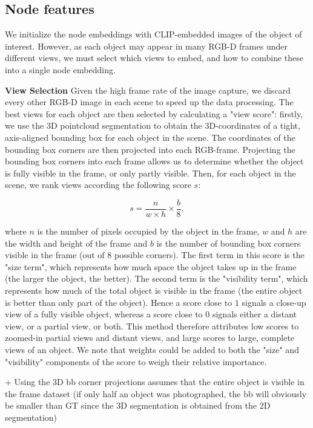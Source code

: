 \subsection{Node features}
We initialize the node embeddings with CLIP-embedded images of the object of interest. However, as each object may appear in many RGB-D frames under different views, we must select which views to embed, and how to combine these into a single node embedding.

\bigskip
\noindent
\textbf{View Selection}
Given the high frame rate of the image capture, we discard every other RGB-D image in each scene to speed up the data processing. The best views for each object are then selected by calculating a "view score": firstly, we use the 3D pointcloud segmentation to obtain the 3D-coordinates of a tight, axis-aligned bounding box for each object in the scene. The coordinates of the bounding box corners are then projected into each RGB-frame. Projecting the bounding box corners into each frame allows us to determine whether the object is fully visible in the frame, or only partly visible. Then, for each object in the scene, we rank views according the following score $s$:

\begin{equation*}
    s = \frac{n}{w \times h} \times \frac{b}{8},
\end{equation*}

where $n$ is the number of pixels occupied by the object in the frame, $w$ and $h$ are the width and height of the frame and $b$ is the number of bounding box corners visible in the frame (out of 8 possible corners). The first term in this score is the "size term", which represents how much space the object takes up in the frame (the larger the object, the better). The second term is the "visibility term", which represents how much of the total object is visible in the frame (the entire object is better than only part of the object). Hence a score close to $1$ signals a close-up view of a fully visible object, whereas a score close to $0$ signals either a distant view, or a partial view, or both. This method therefore attributes low scores to zoomed-in partial views and distant views, and large scores to large, complete views of an object. We note that weights could be added to both the "size" and "visibility" components of the score to weigh their relative importance.

+ Using the 3D bb corner projections assumes that the entire object is visible in the frame dataset (if only half an object was photographed, the bb will obviously be smaller than GT since the 3D segmentation is obtained from the 2D segmentation)

